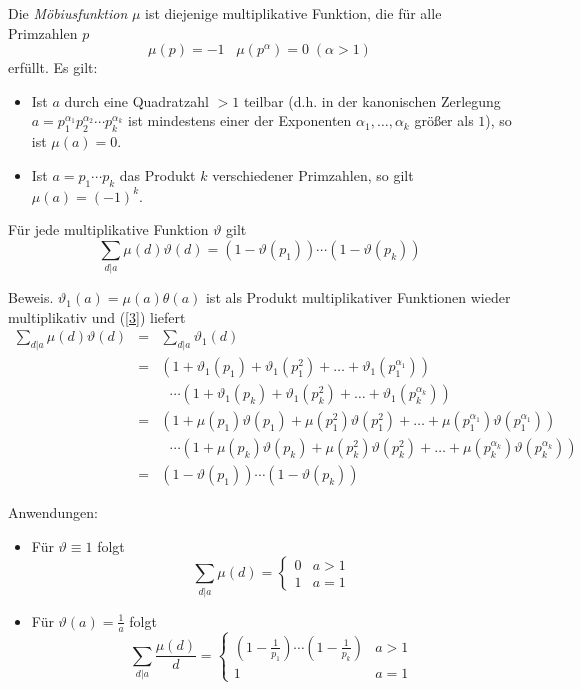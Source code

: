 \documentclass[11pt]{article}
\begin{document}
Die {\it M\"{o}biusfunktion} $\mu$ ist diejenige multiplikative Funktion, die
f\"{u}r alle Primzahlen $p$
\[\mu (p)=-1\;\;\;\mu (p^\alpha)=0 \;(\alpha>1)\]
erf\"{u}llt. Es gilt:
\begin{itemize}
\item Ist $a$ durch eine Quadratzahl $>1$ teilbar (d.h. in der kanonischen
Zerlegung $a=p_1^{\alpha_1} p_2^{\alpha_2}\cdots p_k^{\alpha_k}$ ist
mindestens einer der Exponenten $\alpha_1,\ldots,\alpha_k$ gr\"{o}{\ss}er als
$1$), so ist $\mu(a)=0$.
\item Ist $a=p_1\cdots p_k$ das Produkt $k$ verschiedener Primzahlen, so gilt
$\mu(a)=(-1)^k$.
\end{itemize}
\begin{theorem}
F\"{u}r jede multiplikative Funktion $\vartheta$ gilt
\[\sum_{d|a}\mu(d)\vartheta(d)=(1-\vartheta(p_1))\cdots(1-\vartheta(p_k))\]
\end{theorem}
Beweis. $\vartheta_1(a)=\mu(a)\theta(a)$ ist als Produkt
multiplikativer Funktionen wieder multiplikativ und (\ref{3})
liefert
\begin{eqnarray*}
\sum_{d|a}\mu(d)\vartheta(d)&=&\sum_{d|a}\vartheta_1(d)\\
&=&(1+\vartheta_1(p_1)+\vartheta_1(p_1^2)+\ldots
+\vartheta_1(p_1^{\alpha_1}))\\ 
&& \ \ \ \cdots
(1+\vartheta_1(p_k)+\vartheta_1(p_k^2)+\ldots+\vartheta_1(p_k^{\alpha_k}))\\
&=&(1+\mu(p_1)\vartheta(p_1)+\mu(p_1^2)\vartheta(p_1^2)+\ldots
+\mu(p_1^{\alpha_1})\vartheta(p_1^{\alpha_1}))\\
&& \ \ \ \cdots
(1+\mu(p_k)\vartheta(p_k)+\mu(p_k^2)\vartheta(p_k^2)+\ldots
+\mu(p_k^{\alpha_k})\vartheta(p_k^{\alpha_k}))\\ 
&=&(1-\vartheta(p_1))\cdots(1-\vartheta(p_k))
\end{eqnarray*}

\noindent Anwendungen:
\begin{itemize}
\item F\"{u}r $\vartheta\equiv 1$ folgt
\[\sum_{d|a}\mu(d)=\begin{cases}0&a>1\\1&a=1\end{cases}\]
\item F\"{u}r $\vartheta(a)=\frac{1}{a}$ folgt
\[\sum_{d|a}\frac{\mu(d)}{d}=
\begin{cases}
(1-\frac{1}{p_1})\cdots(1-\frac{1}{p_k})&a>1\\1&a=1
\end{cases}\]
\end{itemize}
\end{document}
